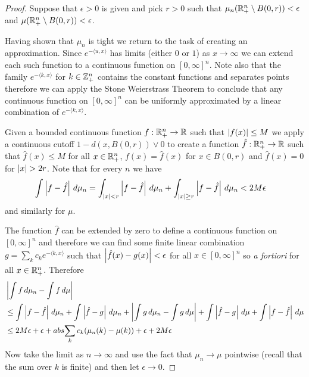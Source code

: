 \begin{proof}
Suppose that $\epsilon > 0$ is given and
pick $r > 0$ such that $\mu_n(\mathbb{R}^n_+ \setminus B(0, r)) <
\epsilon$ and $\mu(\mathbb{R}^n_+ \setminus B(0, r)) < \epsilon$.

Having shown that $\mu_n$ is tight we return to the task of creating
an approximation.  Since $e^{-\langle u,x \rangle}$
has limits (either $0$ or $1$) as $x \to \infty$ we can extend each
such function to
a continuous function on $[0,\infty]^n$.  Note also that the family $e^{-\langle k, x
  \rangle}$ for $k \in \mathbb{Z}^n_+$ contains the constant functions
and separates points therefore we can apply the Stone Weierstrass
Theorem to conclude that any
continuous function on $[0,\infty]^n$ can be uniformly approximated by
a linear combination of $e^{-\langle k, x  \rangle}$. 

Given a bounded continuous function $f : \mathbb{R}^n_+ \to \mathbb{R}$ such
that $\left \vert f(x) \right \vert \leq M$ we
apply a continuous cutoff $1 - d(x,B(0,r)) \vee 0$ to create a function $\hat{f} : \mathbb{R}^n_+
\to \mathbb{R}$ such that $\hat{f}(x) \leq M$ for all $x \in \mathbb{R}^n_+$, $f(x) = \hat{f}(x)$ for $x \in B(0,r)$ and
$\hat{f}(x) = 0$ for $\left \vert x \right \vert > 2r$.  Note that for every $n$ we have
\begin{align*}
\int \left \vert f - \hat{f} \right \vert \, d\mu_n &= 
\int_{\left \vert x \right \vert < r} \left \vert f -  \hat{f} \right \vert \, d\mu_n + 
\int_{\left \vert x \right \vert \geq r} \left \vert f -  \hat{f} \right \vert \, d\mu_n < 2 M \epsilon
\end{align*}
and similarly for $\mu$.

The function $\hat{f}$ can be
extended by zero to define a continuous function on $[0,\infty]^n$ and
therefore we can find some finite linear combination $g = \sum_k c_k
e^{-\langle k, x \rangle}$ such that $\left \vert \hat{f}(x) - g(x) \right \vert<
\epsilon$ for all $x \in [0, \infty]^n$ so \emph{a fortiori} for all $x \in \mathbb{R}^n_+$.  Therefore
\begin{align*}
&\left \vert \int f \, d\mu_n - \int f \, d \mu \right \vert \\
&\leq \int \left \vert f - \hat{f} \right \vert
\, d\mu_n + \int \left \vert \hat{f} - g \right \vert\, d\mu_n + \left \vert \int  g\, d\mu_n -
  \int g \, d\mu \right \vert + \int \left \vert \hat{f} - g \right \vert\, d\mu + \int \left \vert f - \hat{f} \right \vert
\, d\mu \\
&\leq 2M \epsilon + \epsilon + abs{\sum_k c_k ( \mu_n(k) - \mu(k))} +
\epsilon + 2M \epsilon
\end{align*}
Now take the limit as $n \to \infty$ and use the fact that $\mu_n \to \mu$ pointwise (recall that the sum
over $k$ is finite) and then let $\epsilon \to 0$.
\end{proof}
